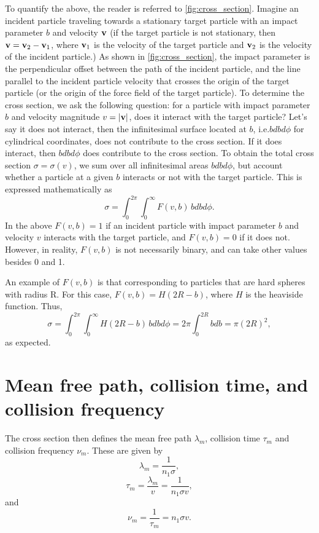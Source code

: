 \documentclass[a4paper,11pt]{report}
\begin{document}
To quantify the above, the reader is referred to \cref{fig:cross_section}. Imagine an incident particle traveling towards a stationary target particle with an impact parameter $b$ and velocity $\mathbf{v}$ (if the target particle is not stationary, then $\mathbf{v} = \mathbf{v}_2 - \mathbf{v}_1$, where $\mathbf{v}_1$ is the velocity of the target particle and $\mathbf{v}_2$ is the velocity of the incident particle.) As shown in \cref{fig:cross_section}, the impact parameter is the perpendicular offset between the path of the incident particle, and the line parallel to the incident particle velocity that crosses the origin of the target particle (or the origin of the force field of the target particle). To determine the cross section, we ask the following question: for a particle with impact parameter $b$ and velocity magnitude $v = |\mathbf{v}|$, does it interact with the target particle? Let's say it does not interact, then the infinitesimal surface located at $b$, i.e.\@ $b db d\phi$ for cylindrical coordinates, does not contribute to the cross section. If it does interact, then $b db d\phi$ does contribute to the cross section. To obtain the total cross section $\sigma = \sigma(v)$, we sum over all infinitesimal areas $b db d\phi$, but account whether a particle at a given $b$ interacts or not with the target particle. This is expressed mathematically as
\begin{equation}
\label{eq:def_cross_section}
    \sigma = \int_0^{2\pi} \int_0^\infty F(v,b) \, b db d\phi.
\end{equation}
In the above $F(v,b) = 1$ if an incident particle with impact parameter $b$ and velocity $v$ interacts with the target particle, and $F(v,b) = 0$ if it does not. However, in reality, $F(v,b)$ is not necessarily binary, and can take other values besides 0 and 1.

An example of $F(v,b)$ is that corresponding to particles that are hard spheres with radius R. For this case, $F(v,b) = H(2R - b)$, where $H$ is the heaviside function. Thus,
\begin{equation}
    \sigma = \int_0^{2\pi} \int_0^\infty H(2R-b) \, b db d\phi = 2\pi \int_0^{2R} b db = \pi (2R)^2,
\end{equation}
as expected.

\section{Mean free path, collision time, and collision frequency}
The cross section then defines the mean free path $\lambda_m$, collision time $\tau_m$ and collision frequency $\nu_m$. These are given by
\begin{equation}
    \lambda_m = \frac{1}{n_1 \sigma},
\end{equation}
\begin{equation}
    \tau_m = \frac{\lambda_m}{v} = \frac{1}{n_1 \sigma v},
\end{equation}
and
\begin{equation}
    \nu_{m} = \frac{1}{\tau_m} = n_1 \sigma v.
\end{equation}
\end{document}
